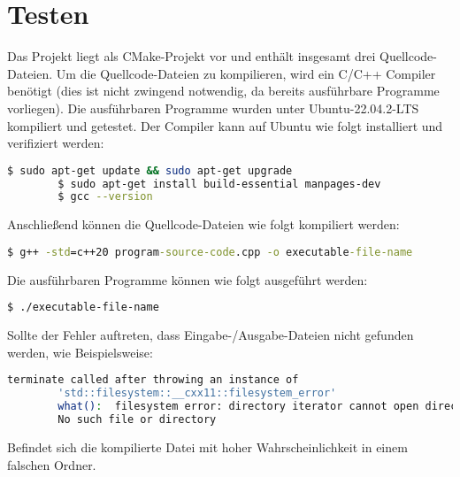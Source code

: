 \documentclass[a4paper,10pt,ngerman]{scrartcl}
\begin{document}
    \section{Testen}\label{sec:testen}
    Das Projekt liegt als CMake-Projekt vor und enthält insgesamt drei Quellcode-Dateien.
    Um die Quellcode-Dateien zu kompilieren, wird ein C/C++ Compiler benötigt
    (dies ist nicht zwingend notwendig, da bereits ausführbare Programme vorliegen).
    Die ausführbaren Programme wurden unter Ubuntu-22.04.2-LTS kompiliert und getestet.
    \newpage
    Der Compiler kann auf Ubuntu wie folgt installiert und verifiziert werden:
    \begin{lstlisting}[language=bash,label={lst:install}]
        $ sudo apt-get update && sudo apt-get upgrade
        $ sudo apt-get install build-essential manpages-dev
        $ gcc --version
    \end{lstlisting}
    Anschließend können die Quellcode-Dateien wie folgt kompiliert werden:
    \begin{lstlisting}[language=cmd,label={lst:compile}]
        $ g++ -std=c++20 program-source-code.cpp -o executable-file-name
    \end{lstlisting}
    Die ausführbaren Programme können wie folgt ausgeführt werden:
    \begin{lstlisting}[language=bash,label={lst:run}]
        $ ./executable-file-name
    \end{lstlisting}
    Sollte der Fehler auftreten, dass Eingabe-/Ausgabe-Dateien nicht gefunden werden,
    wie Beispielsweise:
    \begin{lstlisting}[language=bash,label={lst:error}]
        terminate called after throwing an instance of
        'std::filesystem::__cxx11::filesystem_error'
        what():  filesystem error: directory iterator cannot open directory:
        No such file or directory
    \end{lstlisting}
    Befindet sich die kompilierte Datei mit hoher Wahrscheinlichkeit in einem falschen Ordner.
\end{document}
